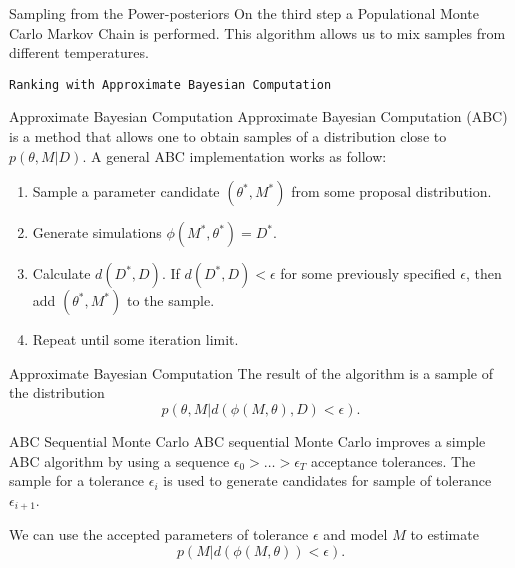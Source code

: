 \documentclass{beamer}
\begin{document}
\begin{frame}{Sampling from the Power-posteriors}
On the third step a Populational Monte Carlo Markov Chain is performed.
This algorithm allows us to mix samples from different temperatures.
\end{frame}


\begin{frame}{}
\begin{center}
    \texttt{Ranking with Approximate Bayesian Computation}
\end{center}
\end{frame}


\begin{frame}{Approximate Bayesian Computation}
Approximate Bayesian Computation (ABC) is a method that allows one to
obtain samples of a distribution close to $p (\theta, M | D)$. \pause
A general ABC implementation works as follow:

\begin{enumerate}
    \pause
    \item{Sample a parameter candidate $(\theta^*, M^*)$ from some 
        proposal distribution.}
    \pause
    \item{Generate simulations $\phi (M^*, \theta^*) = D^*$.}
    \pause
    \item{Calculate $d (D^*, D).$ If $d (D^*, D) < \epsilon$ for some 
        previously specified $\epsilon$, then add $(\theta^*, M^*)$ to 
        the sample.}
    \pause
    \item{Repeat until some iteration limit.}
\end{enumerate}
\end{frame}


\begin{frame}{Approximate Bayesian Computation}
The result of the algorithm is a sample of the distribution 
\begin{equation*}
p (\theta, M| d (\phi (M, \theta), D) < \epsilon).
\end{equation*}

\end{frame}

\begin{frame}{ABC Sequential Monte Carlo}
ABC sequential Monte Carlo improves a simple ABC algorithm by using a 
sequence $\epsilon_0 > \ldots > \epsilon_T$ acceptance tolerances. 
\pause The sample for a tolerance $\epsilon_i$ is used to generate 
candidates for sample of tolerance $\epsilon_{i + 1}$.

\pause
We can use the accepted parameters of tolerance $\epsilon$ and model $M$
to estimate 
\begin{equation*}
    p (M | d (\phi (M, \theta)) < \epsilon).
\end{equation*}
\end{frame}
\end{document}

